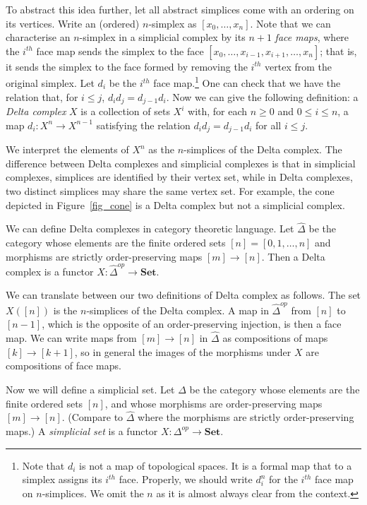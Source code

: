 \documentclass[a4paper,12pt,leqno]{article} \usepackage{amsmath}
\theoremstyle{definition}
\begin{document}
To abstract this idea further, let all abstract simplices come with an ordering
on its vertices.
Write an (ordered) $n$-simplex as $[x_0,\dots,x_n]$.
Note
that we can characterise an $n$-simplex in a simplicial complex by its $n+1$
\emph{face maps}, where the $i^{th}$ face map sends the simplex to the face
$[x_0,\dots, x_{i-1},x_{i+1},\dots, x_n]$; that is, it sends the simplex to the
face formed by removing the $i^{th}$ vertex from the original simplex.
Let
$d_i$ be the $i^{th}$ face map.\footnote{ Note that $d_i$ is not a map of
topological spaces.
It is a formal map that to a simplex assigns its $i^{th}$
face.
Properly, we should write $d_i^n$ for the $i^{th}$ face map on
$n$-simplices.
We omit the $n$ as it is almost always clear from the context.
} One can check that we have the relation that, for $i \leq j$, $d_id_j
= d_{j-1}d_i$.
Now we can give the following definition: a \emph{Delta complex}
$X$ is a collection of sets $X^i$ with, for each $n\geq 0$ and $0\leq i\leq n$,
a map $d_i: X^{n}\to X^{n-1}$ satisfying the relation $d_id_j = d_{j-1}d_i$ for
all $i\leq j$.

We interpret the elements of $X^n$ as the $n$-simplices of the Delta complex.
The difference between Delta complexes and simplicial complexes is that in
simplicial complexes, simplices are identified by their vertex set, while in
Delta complexes, two distinct simplices may share the same vertex set.
For
example, the cone depicted in Figure~\ref{fig_cone} is a Delta complex but not
a simplicial complex.

We can define Delta complexes in category theoretic language.
Let
$\hat{\Delta}$ be the category whose elements are the finite ordered sets $[n]
= [0,1,\ldots, n]$ and morphisms are strictly order-preserving maps $[m]\to
[n]$.
Then a Delta complex is a functor $X: \hat{\Delta}^{op}\to \textbf{Set}$.

We can translate between our two definitions of Delta complex as follows.
The
set $X([n])$ is the $n$-simplices of the Delta complex.
A map in
$\hat{\Delta}^{op}$ from $[n]$ to $[n-1]$, which is the opposite of an
order-preserving injection, is then a face map.
We can write maps from $[m]\to
[n]$ in $\hat{\Delta}$ as compositions of maps $[k]\to [k+1]$, so in general the
images of the morphisms under $X$ are compositions of face maps.

Now we will define a simplicial set.
Let $\Delta$ be the category whose
elements are the finite ordered sets $[n]$, and whose morphisms are
order-preserving maps $[m]\to [n]$.
(Compare to $\hat{\Delta}$ where the
morphisms are strictly order-preserving maps.) A \emph{simplicial set} is
a functor $X: \Delta^{op}\to \textbf{Set}$.
\end{document}
